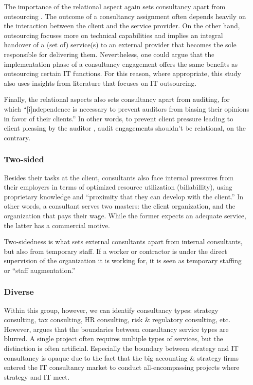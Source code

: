 \documentclass[12pt]{article}
\begin{document}
The importance of the relational aspect again sets consultancy apart
from outsourcing \citep[ 171-173]{kipping2012}. The outcome of a
consultancy assignment often depends heavily on the interaction between
the client and the service provider. On the other hand, outsourcing
focuses more on technical capabilities and implies an integral handover
of a (set of) service(s) to an external provider that becomes the sole
responsible for delivering them. Nevertheless, one could argue that the
implementation phase of a consultancy engagement offers the same
benefits as outsourcing certain IT functions. For this reason, where
appropriate, this study also uses insights from literature that focuses
on IT outsourcing.

Finally, the relational aspects also sets consultancy apart from
auditing, for which ``{[}i{]}ndependence is necessary to prevent
auditors from biasing their opinions in favor of their clients.''
\citep[ 310]{bazerman2011} In other words, to prevent client pressure
leading to client pleasing by the auditor \citep{koch2017}, audit
engagements shouldn't be relational, on the contrary.

\subsubsection{Two-sided}\label{two-sided}

Besides their tasks at the client, consultants also face internal
pressures from their employers in terms of optimized resource
utilization (billabillity), using proprietary knowledge and ``proximity
that they can develop with the client.'' \citet[138]{chowdhury2021} In
other words, a consultant serves two masters: the client organization,
and the organization that pays their wage. While the former expects an
adequate service, the latter has a commercial motive. \citep[
270]{furusten2012}

Two-sidedness is what sets external consultants apart from internal
consultants, but also from temporary staff. If a worker or contractor is
under the direct supervision of the organization it is working for, it
is seen as temporary staffing or ``staff augmentation.'' \citep[
1]{hodosi2019}

\subsubsection{Diverse}\label{diverse}

Within this group, however, we can identify consultancy types: strategy
consulting, tax consulting, HR consulting, risk \& regulatory
consulting, etc. However, \citet[71-72]{armbruster2006} argues that the
boundaries between consultancy service types are blurred. A single
project often requires multiple types of services, but the distinction
is often artificial. Especially the boundary between strategy and IT
consultancy is opaque due to the fact that the big accounting \&
strategy firms entered the IT consultancy market to conduct
all-encompassing projects where strategy and IT meet.
\end{document}

